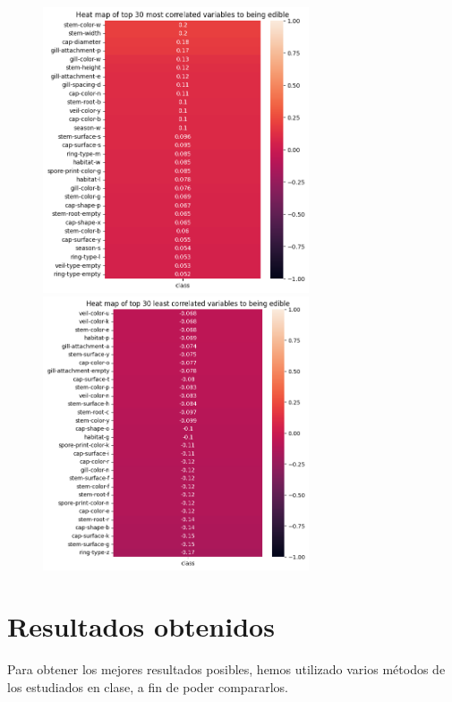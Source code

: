 \documentclass[11pt]{article}
\begin{document}
 \begin{figure}[H]
    \begin{center}
    \includegraphics[width=0.7\textwidth]{Results/Analysis/heatMap30Best.png}
    \includegraphics[width=0.7\textwidth]{Results/Analysis/heatMap30Worst.png}
    \end{center}
 \end{figure}
 
 
\newpage
\section{Resultados obtenidos}

Para obtener los mejores resultados posibles, hemos utilizado varios métodos de los estudiados en clase, a fin de poder compararlos. 
\end{document}
